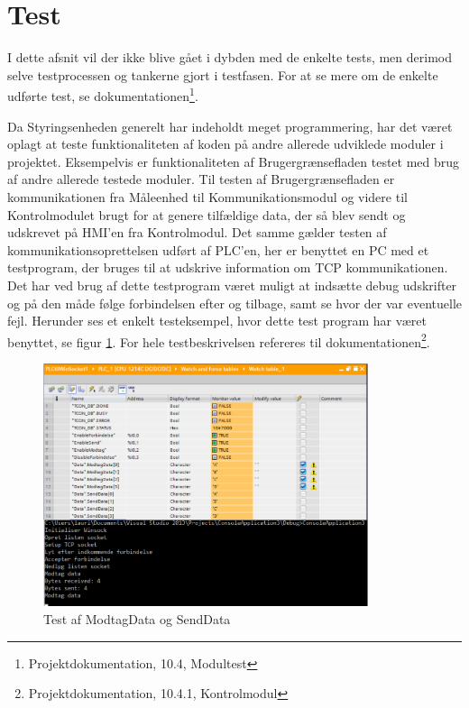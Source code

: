 
\section{Test}

I dette afsnit vil der ikke blive gået i dybden med de enkelte tests, men derimod selve testprocessen og tankerne gjort i testfasen. For at se mere om de enkelte udførte test, se dokumentationen\footnote{Projektdokumentation, 10.4, Modultest}.

Da Styringsenheden generelt har indeholdt meget programmering, har det været oplagt at teste funktionaliteten af koden på andre allerede udviklede moduler i projektet.  Eksempelvis er funktionaliteten af Brugergrænsefladen testet med brug af andre allerede testede moduler. Til testen af Brugergrænsefladen er kommunikationen fra Måleenhed til Kommunikationsmodul og videre til Kontrolmodulet brugt for at genere tilfældige data, der så blev sendt og udskrevet på HMI'en fra Kontrolmodul. Det samme gælder testen af kommunikationsoprettelsen udført af PLC'en, her er benyttet en PC med et testprogram, der bruges til at udskrive information om TCP kommunikationen. Det har ved brug af dette testprogram været muligt at indsætte debug udskrifter og på den måde følge forbindelsen efter og tilbage, samt se hvor der var eventuelle fejl.  Herunder ses et enkelt testeksempel, hvor dette test program har været benyttet, se figur \ref{fig:TestModtagSendData}. For hele testbeskrivelsen refereres til dokumentationen\footnote{Projektdokumentation, 10.4.1, Kontrolmodul}.


\begin{figure}[H] %
	\centering
	\includegraphics[width=0.85\textwidth]{figure/ModtagDataOgSendData}
	\caption{Test af ModtagData og SendData}
	\label{fig:TestModtagSendData}
\end{figure}
